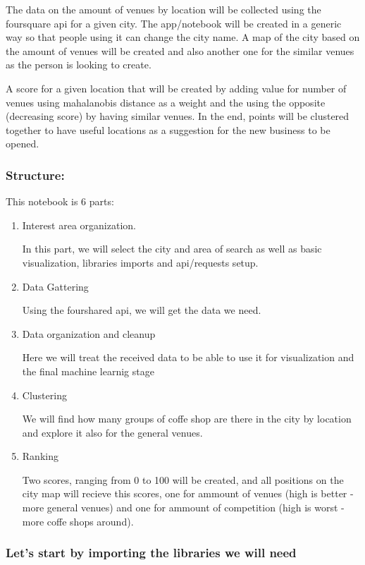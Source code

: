\documentclass[11pt]{article}
\begin{document}
The data on the amount of venues by location will be collected using the
foursquare api for a given city. The app/notebook will be created in a
generic way so that people using it can change the city name. A map of
the city based on the amount of venues will be created and also another
one for the similar venues as the person is looking to create.

A score for a given location that will be created by adding value for
number of venues using mahalanobis distance as a weight and the using
the opposite (decreasing score) by having similar venues. In the end,
points will be clustered together to have useful locations as a
suggestion for the new business to be opened.

    \hypertarget{structure}{%
\subsubsection{Structure:}\label{structure}}

This notebook is 6 parts:

\begin{enumerate}
\def\labelenumi{\arabic{enumi}.}
\item
  Interest area organization.

  In this part, we will select the city and area of search as well as
  basic visualization, libraries imports and api/requests setup.
\item
  Data Gattering

  Using the fourshared api, we will get the data we need.
\item
  Data organization and cleanup

  Here we will treat the received data to be able to use it for
  visualization and the final machine learnig stage
\item
  Clustering

  We will find how many groups of coffe shop are there in the city by
  location and explore it also for the general venues.
\item
  Ranking

  Two scores, ranging from 0 to 100 will be created, and all positions
  on the city map will recieve this scores, one for ammount of venues
  (high is better - more general venues) and one for ammount of
  competition (high is worst - more coffe shops around).
\end{enumerate}

    \hypertarget{lets-start-by-importing-the-libraries-we-will-need}{%
\subsubsection{Let's start by importing the libraries we will
need}\label{lets-start-by-importing-the-libraries-we-will-need}}
\end{document}
